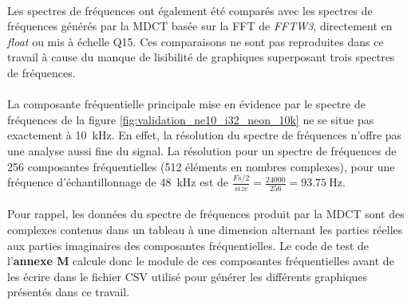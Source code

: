 \documentclass{article}
\begin{document}
    \paragraph{}
    Les spectres de fréquences ont également été comparés avec les spectres de fréquences générés par la MDCT basée sur la FFT de \emph{FFTW3}, directement en \emph{float} ou mis à échelle Q15. Ces comparaisons ne sont pas reproduites dans ce travail à cause du manque de lisibilité de graphiques superposant trois spectres de fréquences.

    \paragraph{}
    La composante fréquentielle principale mise en évidence par le spectre de fréquences de la figure \ref{fig:validation_ne10_i32_neon_10k} ne se situe pas exactement à \SI{10}{\kilo\hertz}. En effet, la résolution du spectre de fréquences n'offre pas une analyse aussi fine du signal. La résolution pour un spectre de fréquences de 256 composantes fréquentielles (512 éléments en nombres complexes), pour une fréquence d'échantillonnage de \SI{48}{\kilo\hertz} est de $\frac{Fs / 2}{size} = \frac{24000}{256} = \SI{93.75}{\hertz}$.

    \paragraph{}
    Pour rappel, les données du spectre de fréquences produit par la MDCT sont des complexes contenus dans un tableau à une dimension alternant les parties réelles aux parties imaginaires des composantes fréquentielles. Le code de test de l'\textbf{annexe M} calcule donc le module de ces composantes fréquentielles avant de les écrire dans le fichier CSV utilisé pour générer les différents graphiques présentés dans ce travail.
\end{document}
